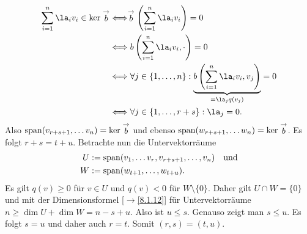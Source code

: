 \documentclass[../../main.tex]{subfiles}
\begin{document}
\begin{cproof}
\begin{itemize}
            \begin{align*}
                \sum_{i=1}^n \la_i v_i\in \ker \rvec b&\Longleftrightarrow \rvec b\left(\sum_{i=1}^n \la_i v_i\right)=0\\
                &\Longleftrightarrow b\left(\sum_{i=1}^n \la_i v_i,\cdot\right)=0\\
                &\Longleftrightarrow \forall j\in\{1,\ldots ,n\}: \underbrace{b\left(\sum_{i=1}^n \la_i v_i,v_j\right)}_{=\la_j q(v_j)}=0\\
                &\Longleftrightarrow \forall j\in\{1,\ldots ,r+s\}: \la_j=0.
            \end{align*}
            Also $\operatorname{span}(v_{r+s+1},\ldots v_n)=\ker \stackrel{\rightarrow}{b}$ und ebenso $\operatorname{span}(w_{r+s+1},\ldots w_n)=\ker \stackrel{\rightarrow}{b}$. Es folgt $r+s=t+u$. Betrachte nun die Untervektorräume
            \begin{align*}
                U&:=\operatorname{span}(v_1,\ldots v_r,v_{r+s+1},\ldots ,v_n)\quad\text{und} \\
                W&:=\operatorname{span}(w_{t+1},\ldots ,w_{t+u}).
            \end{align*}
            Es gilt $q(v)\ge 0$ für $v\in U$ und $q(v)<0$ für $W\setminus\{0\}$. Daher gilt $U\cap W=\{0\}$ und mit der Dimensionsformel [$\to$\ref{8.1.12}] für Untervektorräume $n\ge \dim U+\dim W=n-s+u$. Also ist $u\le s$. Genauso zeigt man $s\le u$. Es folgt $s=u$ und daher auch $r=t$. Somit $(r,s)=(t,u)$. 
    \end{itemize}
\end{cproof}
\end{document}
